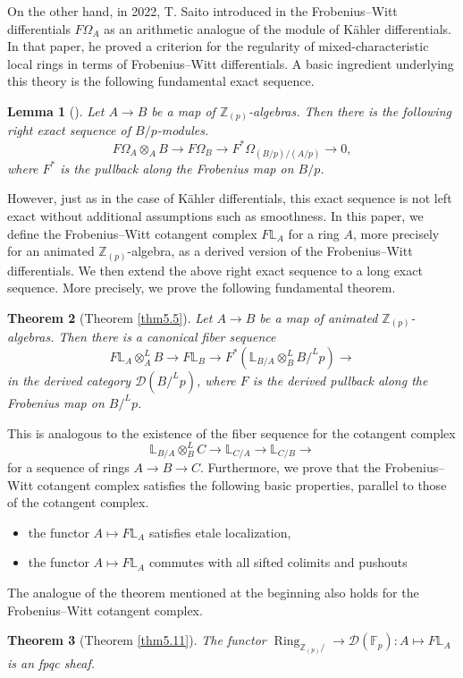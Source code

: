 \documentclass[11pt, a4paper]{amsart}
\theoremstyle{plain}
\newtheorem{theorem}{Theorem}[section]
\newtheorem{lemma}[theorem]{Lemma}
\theoremstyle{definition}
\begin{document}
On the other hand, in 2022, T. Saito introduced in \cite{Sai22} the Frobenius--Witt differentials $F\Omega_A$ as an arithmetic analogue of the module of Kähler differentials. In that paper, he proved a criterion for the regularity of mixed-characteristic local rings in terms of Frobenius--Witt differentials. A basic ingredient underlying this theory is the following fundamental exact sequence.
\begin{lemma}[\cite{Sai22}]
    Let $A\to B$ be a map of $\mathbb Z_{(p)}$-algebras. Then there is the following right exact sequence of $B/p$-modules.
    \[F\Omega_A\otimes _AB\to F\Omega_B\to F^*\Omega_{(B/p)/(A/p)}\to0,\] where $F^*$ is the pullback along the Frobenius map on $B/p$. 
\end{lemma}
However, just as in the case of Kähler differentials, this exact sequence is not left exact without additional assumptions such as smoothness. In this paper, we define the Frobenius--Witt cotangent complex $F\mathbb L_A$ for a ring $A$, more precisely for an animated $\mathbb Z_{(p)}$-algebra, as a derived version of the Frobenius--Witt differentials. We then extend the above right exact sequence to a long exact sequence. More precisely, we prove the following fundamental theorem.
\begin{theorem}[Theorem \ref{thm5.5}]
    Let $A\to B$ be a map of animated $\mathbb Z_{(p)}$-algebras. Then there is a canonical fiber sequence
    \[F\mathbb L_A\otimes_A^LB\to F\mathbb L_B\to F^*(\mathbb L_{B/A}\otimes _B^LB/^Lp)\to \] in the derived category $\mathcal D(B/^Lp)$, where $F$ is the derived pullback along the Frobenius map on $B/^Lp$.
\end{theorem}
This is analogous to the existence of the fiber sequence for the cotangent complex
\[\mathbb L_{B/A}\otimes^L_BC\to \mathbb L_{C/A}\to \mathbb L_{C/B}\to \] for a sequence of rings $A \to B \to C$.
Furthermore, we prove that the Frobenius--Witt cotangent complex satisfies the following basic properties, parallel to those of the cotangent complex.
\begin{itemize}
    \item the functor $A\mapsto F\mathbb L_A$ satisfies etale localization,
    \item the functor $A\mapsto F\mathbb L_A$ commutes with all sifted colimits and pushouts
\end{itemize}
The analogue of the theorem mentioned at the beginning also holds for the Frobenius--Witt cotangent complex.
\begin{theorem}[Theorem \ref{thm5.11}]
    The functor $\operatorname{Ring}_{\mathbb Z_{(p)}/}\to \mathcal D(\mathbb F_p):A\mapsto F\mathbb L_A$ is an fpqc sheaf.
\end{theorem}
\end{document}
